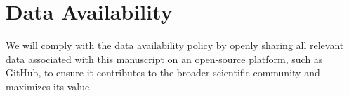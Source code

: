 \appendix

\section{Data Availability}

We will comply with the data availability policy by openly sharing all relevant data associated with this manuscript on an open-source platform, such as GitHub, to ensure it contributes to the broader scientific community and maximizes its value.